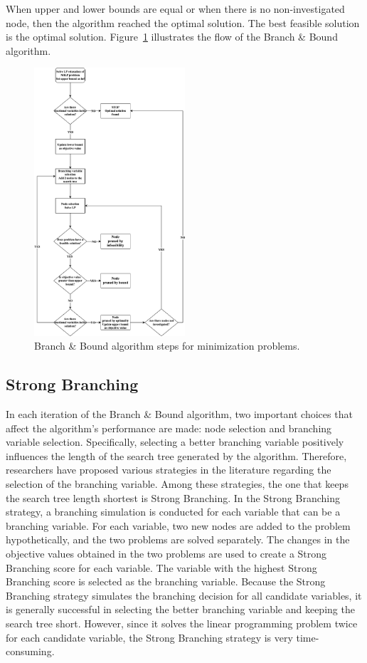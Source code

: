 When upper and lower bounds are equal or when there is no non-investigated node, then the algorithm reached the optimal solution.
The best feasible solution is the optimal solution.
Figure~\ref{fig:branch-bound} illustrates the flow of the Branch \& Bound algorithm.

\begin{figure}[htb!]
    \centering
    \includegraphics[width=0.5\textwidth]{figures/Branch and Bound.drawio}
    \caption{Branch \& Bound algorithm steps for minimization problems.}
    \label{fig:branch-bound}
\end{figure}


\subsection{Strong Branching}\label{subsec:strong-branching}
In each iteration of the Branch \& Bound algorithm, two important choices that affect the algorithm's performance are made: node selection and branching variable selection.
Specifically, selecting a better branching variable positively influences the length of the search tree generated by the algorithm.
Therefore, researchers have proposed various strategies in the literature regarding the selection of the branching variable.
Among these strategies, the one that keeps the search tree length shortest is Strong Branching.
In the Strong Branching strategy, a branching simulation is conducted for each variable that can be a branching variable.
For each variable, two new nodes are added to the problem hypothetically, and the two problems are solved separately.
The changes in the objective values obtained in the two problems are used to create a Strong Branching score for each variable.
The variable with the highest Strong Branching score is selected as the branching variable.
Because the Strong Branching strategy simulates the branching decision for all candidate variables, it is generally successful in selecting the better branching variable and keeping the search tree short.
However, since it solves the linear programming problem twice for each candidate variable, the Strong Branching strategy is very time-consuming.

